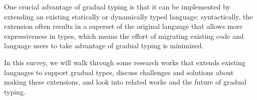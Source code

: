 One crucial advantage of gradual typing is that it can be implemented
by extending an existing statically or dynamically typed language:
syntactically, the extension often results in a superset of the original
language that allows more expressiveness in types, which means
the effort of migrating existing code and language users
to take advantage of gradual typing is minimized.

In this survey, we will walk through some research works that
extends existing languages to support gradual types,
discuss challenges and solutions about making these extensions,
and look into related works and the future of gradual typing.